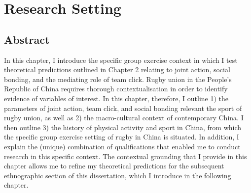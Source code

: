 \chapter{\label{chap:researchSetting}Research Setting}


\minitoc




\section{Abstract}

In this chapter, I introduce the specific group exercise context in which I test theoretical predictions outlined in Chapter 2 relating to joint action, social bonding, and the mediating role of team click.  Rugby union in the People's Republic of China requires thorough contextualisation in order to identify evidence of variables of interest.  In this chapter, therefore, I outline 1) the parameters of joint action, team click, and social bonding relevant the sport of rugby union, as well as 2) the macro-cultural context of contemporary China.  I then outline 3) the history of physical activity and sport in China, from which the specific group exercise setting of rugby in China is situated.   In addition, I explain the (unique) combination of qualifications that enabled me to conduct research in this specific context.  The contextual grounding that I provide in this chapter allows me to refine my theoretical predictions for the subsequent ethnographic section of this dissertation, which I introduce in the following chapter.

